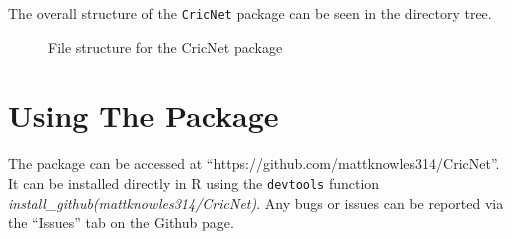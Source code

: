 The overall structure of the \verb|CricNet| package can be seen in the directory tree.\\

\begin{figure}[h]
\caption{File structure for the CricNet package}

    


\end{figure}

\section{Using The Package}
The package can be accessed at ``https://github.com/mattknowles314/CricNet''. It can be installed directly in R using the \verb|devtools| function \textit{install\_github(mattknowles314/CricNet)}. Any bugs or issues can be reported via the ``Issues'' tab on the Github page. 
